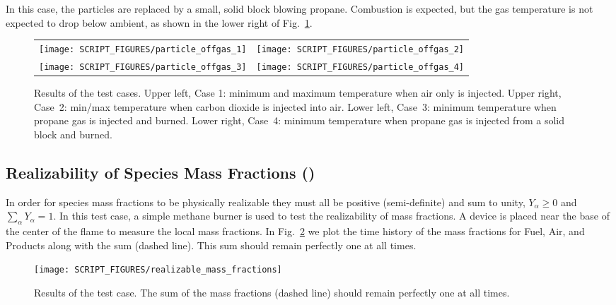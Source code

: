 \documentclass[11pt]{book}
\begin{document}
In this case, the particles are replaced by a small, solid block blowing propane. Combustion is expected, but the gas temperature is not expected to drop below ambient, as shown in the lower right of Fig.~\ref{particle_offgas_plots}.

\begin{figure}[!ht]
\begin{tabular*}{\textwidth}{lr}
\texttt{[image: SCRIPT\_FIGURES/particle\_offgas\_1]} &
\texttt{[image: SCRIPT\_FIGURES/particle\_offgas\_2]} \\
\texttt{[image: SCRIPT\_FIGURES/particle\_offgas\_3]} &
\texttt{[image: SCRIPT\_FIGURES/particle\_offgas\_4]}
\end{tabular*}
\caption[The  test cases]{Results of the  test cases. Upper left, Case 1: minimum and maximum temperature when air only is injected. Upper right, Case~2: min/max temperature when carbon dioxide is injected into air. Lower left, Case~3: minimum temperature when propane gas is injected and burned. Lower right, Case~4: minimum temperature when propane gas is injected from a solid block and burned. }
\label{particle_offgas_plots}
\end{figure}


\subsection{Realizability of Species Mass Fractions (\texorpdfstring{}{realizable\_mass\_fractions})}
\label{realizable_mass_fractions}

In order for species mass fractions to be physically realizable they must all be positive (semi-definite) and sum to unity, $Y_\alpha\ge0$ and $\sum_\alpha Y_\alpha=1$.  In this test case, a simple methane burner is used to test the realizability of mass fractions.  A device is placed near the base of the center of the flame to measure the local mass fractions.  In Fig.~\ref{fig:realizable_mass_fractions} we plot the time history of the mass fractions for Fuel, Air, and Products along with the sum (dashed line).  This sum should remain perfectly one at all times.
\begin{figure}[ht]
\centering
\texttt{[image: SCRIPT\_FIGURES/realizable\_mass\_fractions]}
\caption[The  test case]{Results of the  test case.  The sum of the mass fractions (dashed line) should remain perfectly one at all times.}
\label{fig:realizable_mass_fractions}
\end{figure}
\end{document}
